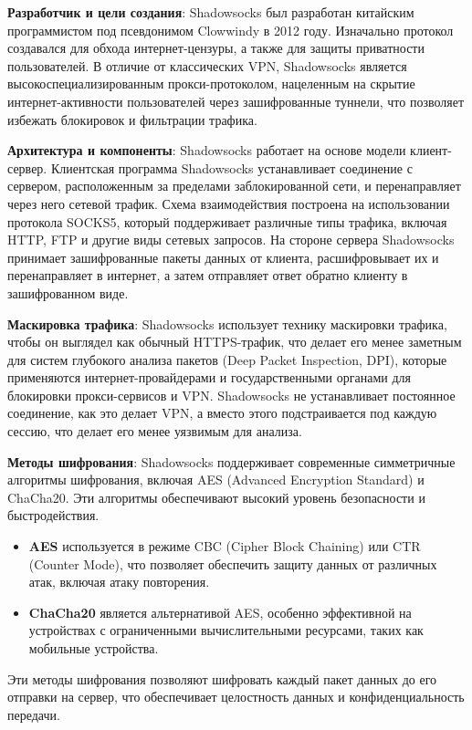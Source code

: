 \documentclass{SCWorks}
\begin{document}
\textbf{Разработчик и цели создания}: Shadowsocks был разработан китайским программистом под псевдонимом Clowwindy в 2012 году. Изначально протокол создавался для обхода интернет-цензуры, а также для защиты приватности пользователей. В отличие от классических VPN, Shadowsocks является высокоспециализированным прокси-протоколом, нацеленным на скрытие интернет-активности пользователей через зашифрованные туннели, что позволяет избежать блокировок и фильтрации трафика.

\textbf{Архитектура и компоненты}: Shadowsocks работает на основе модели клиент-сервер. Клиентская программа Shadowsocks устанавливает соединение с сервером, расположенным за пределами заблокированной сети, и перенаправляет через него сетевой трафик. Схема взаимодействия построена на использовании протокола SOCKS5, который поддерживает различные типы трафика, включая HTTP, FTP и другие виды сетевых запросов. На стороне сервера Shadowsocks принимает зашифрованные пакеты данных от клиента, расшифровывает их и перенаправляет в интернет, а затем отправляет ответ обратно клиенту в зашифрованном виде.

\textbf{Маскировка трафика}: Shadowsocks использует технику маскировки трафика, чтобы он выглядел как обычный HTTPS-трафик, что делает его менее заметным для систем глубокого анализа пакетов (Deep Packet Inspection, DPI), которые применяются интернет-провайдерами и государственными органами для блокировки прокси-сервисов и VPN. Shadowsocks не устанавливает постоянное соединение, как это делает VPN, а вместо этого подстраивается под каждую сессию, что делает его менее уязвимым для анализа.

\textbf{Методы шифрования}: Shadowsocks поддерживает современные симметричные алгоритмы шифрования, включая AES (Advanced Encryption Standard) и ChaCha20. Эти алгоритмы обеспечивают высокий уровень безопасности и быстродействия. 
\begin{itemize}
    \item \textbf{AES} используется в режиме CBC (Cipher Block Chaining) или CTR (Counter Mode), что позволяет обеспечить защиту данных от различных атак, включая атаку повторения.
    \item \textbf{ChaCha20} является альтернативой AES, особенно эффективной на устройствах с ограниченными вычислительными ресурсами, таких как мобильные устройства.
\end{itemize}
Эти методы шифрования позволяют шифровать каждый пакет данных до его отправки на сервер, что обеспечивает целостность данных и конфиденциальность передачи.
\end{document}
